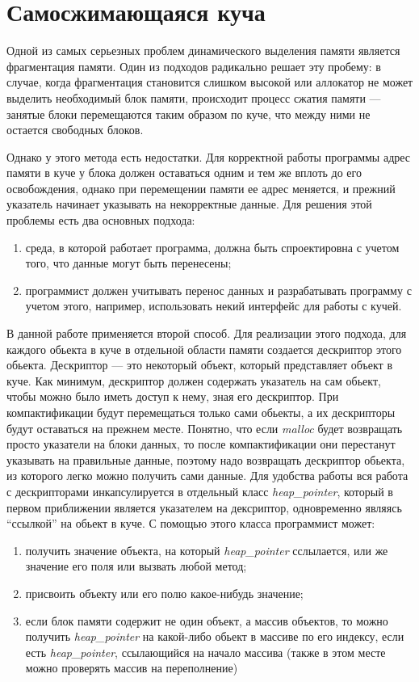 \documentclass[12pt,a4paper]{article}
\begin{document}
\newpage
\section{Самосжимающаяся куча}
Одной из самых серьезных проблем динамического выделения памяти
является фрагментация памяти. Один из подходов
радикально решает эту пробему: в случае,
когда фрагментация становится слишком высокой или аллокатор не может выделить 
необходимый блок памяти, происходит процесс сжатия
памяти --- занятые блоки перемещаются таким образом по куче, что между ними не 
остается свободных блоков.

Однако у этого метода есть недостатки. Для корректной работы программы адрес памяти
в куче у блока должен оставаться
одним и тем же вплоть до его освобождения, однако при перемещении памяти ее адрес
меняется, и прежний указатель начинает указывать на некорректные данные. 
Для решения этой проблемы есть два основных подхода:
\begin{enumerate}
\item 
	среда, в которой работает программа, должна быть спроектировна с учетом того,
    что данные могут быть перенесены;
\item 
	программист должен учитывать перенос данных и разрабатывать программу с учетом
    этого, например, использовать некий интерфейс для работы с кучей.
\end{enumerate}
В данной работе применяется второй способ. Для реализации этого подхода, для каждого 
обьекта в куче в отдельной области памяти создается дескриптор этого обьекта. Дескриптор --- 
это некоторый объект, который представляет объект в куче. Как минимум, дескриптор должен 
содержать указатель на сам обьект, чтобы можно было иметь доступ к нему, зная его дескриптор.
При компактификации будут перемещаться только сами обьекты, а их дескрипторы будут 
оставаться на прежнем месте. Понятно, что если \textit{malloc} будет возвращать 
просто указатели на блоки данных, то после компактификации они перестанут указывать
на правильные данные, поэтому надо возвращать дескриптор  обьекта, из которого легко
можно получить сами данные. Для удобства работы вся работа с дескрипторами инкапсулируется
в отдельный класс \textit{heap\_pointer}, который в первом приближении является указателем
на дексриптор, одновременно являясь ``ссылкой'' на обьект в куче. С помощью этого 
класса программист может:
\begin{enumerate}
\item
получить значение объекта, на который \textit{heap\_pointer} сслылается, или же значение
его поля или вызвать любой метод;
\item
присвоить объекту или его полю какое-нибудь значение; 
\item
если блок памяти содержит не один объект, а массив объектов, то можно получить
\textit{heap\_pointer} на какой-либо обьект в массиве по его индексу, если есть 
\textit{heap\_pointer}, ссылающийся на начало массива (также в этом месте можно 
проверять массив на переполнение)
\end{enumerate}  
\end{document}
